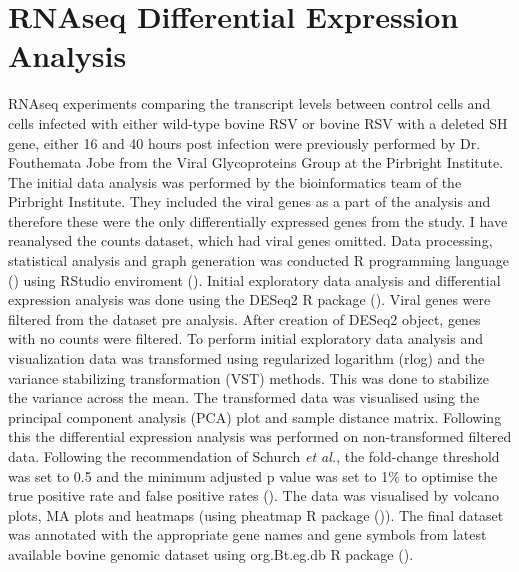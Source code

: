 \section{RNAseq Differential Expression Analysis} \label{RNAseq Differential Expression Analysis}
RNAseq experiments comparing the transcript levels between control cells and cells infected with either wild-type bovine RSV or bovine RSV with a deleted SH gene, either 16 and 40 hours post infection were previously performed by Dr. Fouthemata Jobe from the Viral Glycoproteins Group at the Pirbright Institute. The initial data analysis was performed by the bioinformatics team of the Pirbright Institute. They included the viral genes as a part of the analysis and therefore these were the only differentially expressed genes from the study. I have reanalysed the counts dataset, which had viral genes omitted. Data processing, statistical analysis and graph generation was conducted R programming language (\cite{RCoreTeam2022R:Computing}) using RStudio enviroment (\cite{RStudioTeam2022RStudio:RStudio}). Initial exploratory data analysis and differential expression analysis was done using the DESeq2 R package (\cite{Love2014ModeratedDESeq2}). Viral genes were filtered from the dataset pre analysis. After creation of DESeq2 object, genes with no counts were filtered. To perform initial exploratory data analysis and visualization data was transformed using regularized logarithm (rlog) and the variance stabilizing transformation (VST) methods. This was done to stabilize the variance across the mean. The transformed data was visualised using the principal component analysis (PCA) plot and sample distance matrix. Following this the differential expression analysis was performed on non-transformed filtered data. Following the recommendation of Schurch \textit{et al.}, the fold-change threshold was set to 0.5 and the minimum adjusted p value was set to 1\% to optimise the true positive rate and false positive rates (\cite{Schurch2016HowUse}). The data was visualised by volcano plots, MA plots and heatmaps (using pheatmap R package (\cite{Kolde2019Pheatmap:Heatmaps})). The final dataset was annotated with the appropriate gene names and gene symbols from latest available bovine genomic dataset using org.Bt.eg.db R package (\cite{Carlson2022Org.Bt.eg.db:Bovine}).




